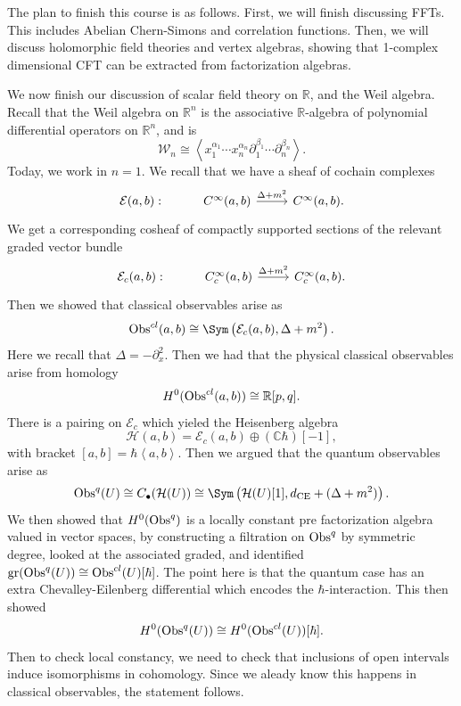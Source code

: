 
The plan to finish this course is as follows. First, we will finish discussing FFTs. This includes Abelian Chern-Simons and correlation functions. Then, we will discuss holomorphic field theories and vertex algebras, showing that 1-complex dimensional CFT can be extracted from factorization algebras.

We now finish our discussion of scalar field theory on $\mathbb{R} $, and the Weil algebra. Recall that the Weil algebra on $\mathbb{R} ^n$ is the associative $\mathbb{R} $-algebra of polynomial differential operators on $\mathbb{R} ^n$, and is
\[
	\mathcal{W}_n \cong \left\langle x_1^{\alpha _1} \cdots x_n^{\alpha _n} \partial _1^{\beta _1} \cdots \partial _n^{\beta _n}  \right\rangle 
.\]
Today, we work in $n=1$. We recall that we have a sheaf of cochain complexes
\[\begin{tikzcd}[row sep = 2.5em, column sep = 2.5em]
\mathcal{E} (a,b) : & C^\infty (a,b)\ar[" \Delta +m^2 ", r]  & C^\infty (a,b).
\end{tikzcd}\]
We get a corresponding cosheaf of compactly supported sections of the relevant graded vector bundle
\[\begin{tikzcd}[row sep = 2.5em, column sep = 2.5em]
\mathcal{E} _c(a,b): & C^\infty _c(a,b)\ar[" \Delta +m^2 ", r]  & C^\infty _c(a,b).
\end{tikzcd}\]
Then we showed that classical observables arise as
\[
	\Obs^{cl} (a,b) \cong \Sym \left( \mathcal{E} _c(a,b),\Delta +m^2 \right) 
.\]
Here we recall that $\Delta =- \partial _x^2$. Then we had that the physical classical observables arise from homology
\[
	H^0(\operatorname{Obs}^{cl} (a,b)) \cong \mathbb{R} [p,q]
.\]
There is a pairing on $\mathcal{E} _c$ which yieled the Heisenberg algebra
\[
	\mathcal{H} (a,b) = \mathcal{E} _c(a,b)\oplus (\mathbb{C} \hbar) [-1],
\]
with bracket $[a,b]=\hbar \left\langle a,b \right\rangle $. Then we argued that the quantum observables arise as
\[
	\Obs^q(U) \cong C_{\bullet} (\mathcal{H} (U)) \cong \Sym \left( \mathcal{H} (U)[1], d_{\mathrm{CE} } +(\Delta +m^2) \right) 
.\]
We then showed that $H^0(\operatorname{Obs}^q)$ is a locally constant pre factorization algebra valued in vector spaces, by constructing a filtration on $\operatorname{Obs}^q$ by symmetric degree, looked at the associated graded, and identified $\mathrm{gr} (\operatorname{Obs}^q(U)) \cong \operatorname{Obs}^{cl} (U)[\hbar ]$. The point here is that the quantum case has an extra Chevalley-Eilenberg differential which encodes the $\hbar $-interaction. This then showed
\[
	H^0(\operatorname{Obs}^q(U)) \cong H^0(\operatorname{Obs}^{cl} (U))[\hbar ]
.\]
Then to check local constancy, we need to check that inclusions of open intervals induce isomorphisms in cohomology. Since we aleady know this happens in classical observables, the statement follows.

